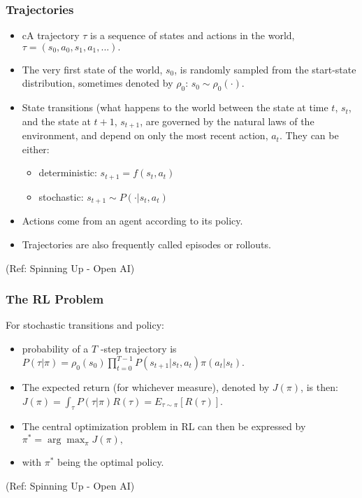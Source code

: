 \begin{frame}[fragile]\frametitle{Trajectories}

\begin{itemize}
\item cA trajectory $\tau$ is a sequence of states and actions in the world, $\tau = (s_0, a_0, s_1, a_1, ...).$
\item The very first state of the world, $s_0$, is randomly sampled from the start-state distribution, sometimes denoted by $\rho_0$:
$s_0 \sim \rho_0(\cdot)$.
\item State transitions (what happens to the world between the state at time $t$, $s_t$, and the state at $t+1$, $s_{t+1}$, are governed by the natural laws of the environment, and depend on only the most recent action, $a_t$. They can be either:
\begin{itemize}
\item deterministic: $s_{t+1} = f(s_t, a_t)$
\item stochastic: $s_{t+1} \sim P(\cdot|s_t, a_t)$
\end{itemize}
\item Actions come from an agent according to its policy.
\item Trajectories are also frequently called episodes or rollouts.
\end{itemize}

{\tiny (Ref: Spinning Up - Open AI)}
\end{frame}

\begin{frame}[fragile]\frametitle{The RL Problem}

For stochastic transitions and policy:

\begin{itemize}
\item probability of a $T$ -step trajectory is $P(\tau|\pi) = \rho_0 (s_0) \prod_{t=0}^{T-1} P(s_{t+1} | s_t, a_t) \pi(a_t | s_t).$
\item The expected return (for whichever measure), denoted by $J(\pi)$, is then: $J(\pi) = \int_{\tau} P(\tau|\pi) R(\tau) = E_{\tau\sim \pi}[R(\tau)]$.
\item The central optimization problem in RL can then be expressed by $\pi^* = \arg \max_{\pi} J(\pi),$
\item with $\pi^*$ being the optimal policy.
\end{itemize}

{\tiny (Ref: Spinning Up - Open AI)}
\end{frame}


